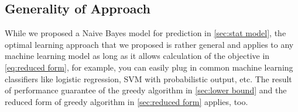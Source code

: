 \subsection{Generality of Approach} \label{sec:generality}
 While we proposed a Naive Bayes model for prediction in \ref{sec:stat model}, the optimal learning approach that we proposed is rather general and applies to any machine learning model as long as it allows calculation of the objective in \eqref{eq:reduced form}, for example, you can easily plug in common machine learning classifiers like logistic regression, SVM with probabilistic output, etc. The result of performance guarantee of the greedy algorithm in \ref{sec:lower bound} and the reduced form of greedy algorithm in \ref{sec:reduced form} applies, too.
